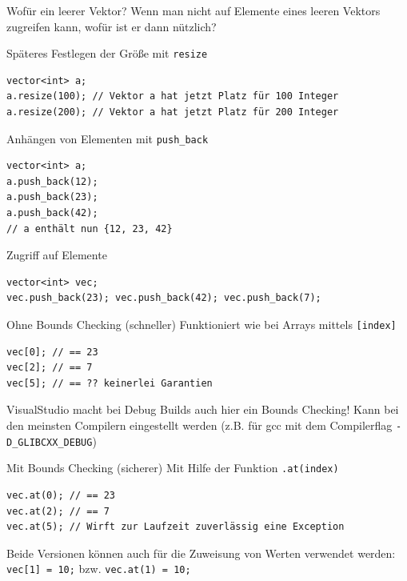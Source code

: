 \documentclass[presentation]{beamer}
\begin{document}
\begin{frame}[label={sec:org696c5fb},fragile]{Wofür ein leerer Vektor?}
 Wenn man nicht auf Elemente eines leeren Vektors zugreifen kann, wofür
ist er dann nützlich?
\begin{exampleblock}{Späteres Festlegen der Größe mit {\color{solarizedYellow}\texttt{resize}}}
\begin{verbatim}
vector<int> a;
a.resize(100); // Vektor a hat jetzt Platz für 100 Integer
a.resize(200); // Vektor a hat jetzt Platz für 200 Integer
\end{verbatim}
\end{exampleblock}
\begin{exampleblock}{Anhängen von Elementen mit {\color{solarizedYellow}\texttt{push_back}}}
\begin{verbatim}
vector<int> a;
a.push_back(12);
a.push_back(23);
a.push_back(42);
// a enthält nun {12, 23, 42}
\end{verbatim}
\end{exampleblock}
\end{frame}
\begin{frame}[label={sec:org47f9082},fragile]{Zugriff auf Elemente}
 \begin{verbatim}
vector<int> vec;
vec.push_back(23); vec.push_back(42); vec.push_back(7);
\end{verbatim}
\begin{block}{Ohne Bounds Checking (schneller)}
Funktioniert wie bei Arrays mittels {\color{solarizedYellow}\verb![index]!}
\begin{verbatim}
vec[0]; // == 23
vec[2]; // == 7
vec[5]; // == ?? keinerlei Garantien
\end{verbatim}
\tiny VisualStudio macht bei Debug Builds auch hier ein Bounds
Checking! Kann bei den meinsten Compilern eingestellt werden (z.B. für
gcc mit dem Compilerflag {\color{solarizedYellow}\verb!-D_GLIBCXX_DEBUG!})
\end{block}
\begin{block}{Mit Bounds Checking (sicherer)}
Mit Hilfe der Funktion {\color{solarizedYellow}\verb!.at(index)!}
\begin{verbatim}
vec.at(0); // == 23
vec.at(2); // == 7
vec.at(5); // Wirft zur Laufzeit zuverlässig eine Exception
\end{verbatim}
\end{block}
Beide Versionen können auch für die Zuweisung von Werten verwendet
werden: {\color{solarizedYellow}\verb!vec[1] = 10;!} bzw. {\color{solarizedYellow}\verb!vec.at(1) = 10;!}
\end{frame}
\end{document}
